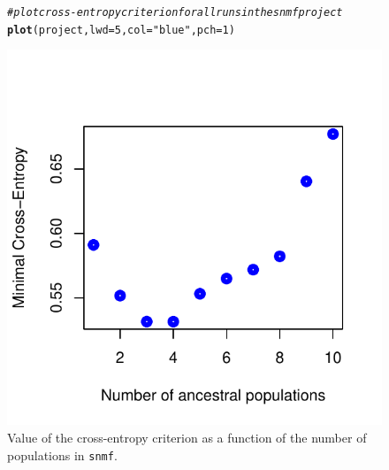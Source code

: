 \documentclass[12pt,a4paper,oneside]{article}\usepackage[]{graphicx}\usepackage[]{color}
\makeatletter
\def\maxwidth{ %
  \ifdim\Gin@nat@width>\linewidth
    \linewidth
  \else
    \Gin@nat@width
  \fi
}
\newcommand{\hlnum}[1]{\textcolor[rgb]{0.686,0.059,0.569}{#1}}%
\newcommand{\hlstr}[1]{\textcolor[rgb]{0.192,0.494,0.8}{#1}}%
\newcommand{\hlcom}[1]{\textcolor[rgb]{0.678,0.584,0.686}{\textit{#1}}}%
\newcommand{\hlstd}[1]{\textcolor[rgb]{0.345,0.345,0.345}{#1}}%
\newcommand{\hlkwc}[1]{\textcolor[rgb]{0.333,0.667,0.333}{#1}}%
\newcommand{\hlkwd}[1]{\textcolor[rgb]{0.737,0.353,0.396}{\textbf{#1}}}%
\newenvironment{kframe}{%
 \def\at@end@of@kframe{}%
 \ifinner\ifhmode%
  \def\at@end@of@kframe{\end{minipage}}%
  \begin{minipage}{\columnwidth}%
 \fi\fi%
 \def\FrameCommand##1{\hskip\@totalleftmargin \hskip-\fboxsep
 \colorbox{shadecolor}{##1}\hskip-\fboxsep
     \hskip-\linewidth \hskip-\@totalleftmargin \hskip\columnwidth}%
 \MakeFramed {\advance\hsize-\width
   \@totalleftmargin\z@ \linewidth\hsize
   \@setminipage}}%
 {\par\unskip\endMakeFramed%
 \at@end@of@kframe}
\newenvironment{knitrout}{}{} %
\makeatother
\begin{document}
\begin{figure}[h!]
    \centering
\begin{knitrout}
\color{fgcolor}\begin{kframe}
\begin{alltt}
\hlcom{# plot cross-entropy criterion for all runs in the snmf project}
\hlkwd{plot}\hlstd{(project,} \hlkwc{lwd} \hlstd{=} \hlnum{5}\hlstd{,} \hlkwc{col} \hlstd{=} \hlstr{"blue"}\hlstd{,} \hlkwc{pch} \hlstd{=} \hlnum{1}\hlstd{)}
\end{alltt}
\end{kframe}
\includegraphics[width=\maxwidth]{figure/unnamed-chunk-9-1} 

\end{knitrout}
\caption{Value of the cross-entropy criterion as a function
of the number of populations in {\tt snmf}.}
\end{figure}
\end{document}
